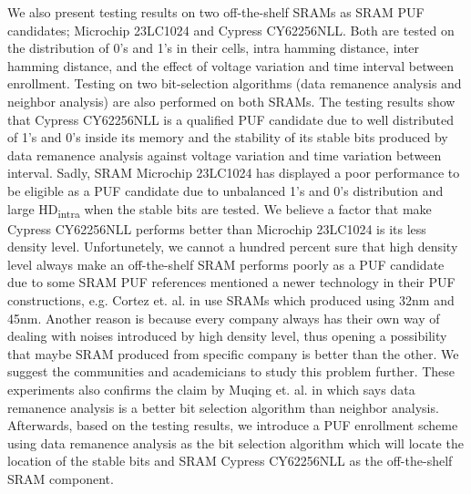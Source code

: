 We also present testing results on two off-the-shelf SRAMs as SRAM PUF candidates; Microchip 23LC1024 and Cypress CY62256NLL. Both are tested on the distribution of 0's and 1's in their cells, intra hamming distance, inter hamming distance, and the effect of voltage variation and time interval between enrollment. Testing on two bit-selection algorithms (data remanence analysis and neighbor analysis) are also performed on both SRAMs. The testing results show that Cypress CY62256NLL is a qualified PUF candidate due to well distributed of 1's and 0's inside its memory and the stability of its stable bits produced by data remanence analysis against voltage variation and time variation between interval. Sadly, SRAM Microchip 23LC1024 has displayed a poor performance to be eligible as a PUF candidate due to unbalanced 1's and 0's distribution and large HD\textsubscript{intra} when the stable bits are tested. We believe a factor that make Cypress CY62256NLL performs better than Microchip 23LC1024 is its less density level. Unfortunetely, we cannot a hundred percent sure that high density level always make an off-the-shelf SRAM performs poorly as a PUF candidate due to some SRAM PUF references mentioned a newer technology in their PUF constructions, e.g. Cortez et. al. in \cite{7102498} use SRAMs which produced using 32nm and 45nm. Another reason is because every company always has their own way of dealing with noises introduced by high density level, thus opening a possibility that maybe SRAM produced from specific company is better than the other. We suggest the communities and academicians to study this problem further.
These experiments also confirms the claim by Muqing et. al. in \cite{liu_zhou_tang_parhi_kim_2017} which says data remanence analysis is a better bit selection algorithm than neighbor analysis.
Afterwards, based on the testing results, we introduce a PUF enrollment scheme using data remanence analysis as the bit selection algorithm which will locate the location of the stable bits and SRAM Cypress CY62256NLL as the off-the-shelf SRAM component.



